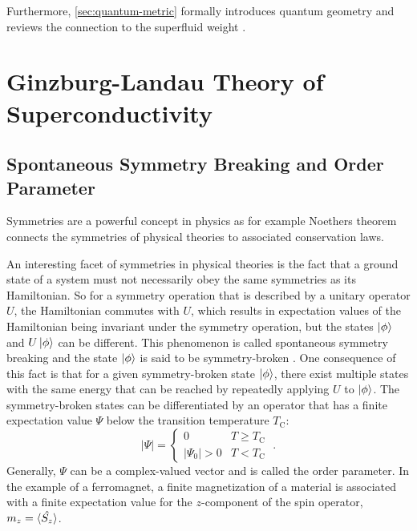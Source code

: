 \documentclass[../main.tex]{subfiles}
\begin{document}
Furthermore, \cref{sec:quantum-metric} formally introduces quantum geometry and reviews the connection to the superfluid weight \cite{peottaSuperfluidityTopologicallyNontrivial2015, yuQuantumGeometryQuantum2024}.

\section{Ginzburg-Landau Theory of Superconductivity}\label{sec:Ginzburg-Landau theory of superconductivity}

\subsection*{Spontaneous Symmetry Breaking and Order Parameter}

Symmetries are a powerful concept in physics as for example Noethers theorem \cite{noetherInvarianteVariationsprobleme1918} connects the symmetries of physical theories to associated conservation laws.

An interesting facet of symmetries in physical theories is the fact that a ground state of a system must not necessarily obey the same symmetries as its Hamiltonian.
So for a symmetry operation that is described by a unitary operator \(U\), the Hamiltonian commutes with \(U\), which results in expectation values of the Hamiltonian being invariant under the symmetry operation, but the states \(\ket{\phi}\) and \(U \ket{\phi}\) can be different.
This phenomenon is called spontaneous symmetry breaking and the state \(\ket{\phi}\) is said to be symmetry-broken \cite{beekmanIntroductionSpontaneousSymmetry2019}.
One consequence of this fact is that for a given symmetry-broken state \(\ket{\phi}\), there exist multiple states with the same energy that can be reached by repeatedly applying \(U\) to \(\ket{\phi}\).
The symmetry-broken states can be differentiated by an operator that has a finite expectation value \(\Psi\) below the transition temperature \(T_{\mathrm{C}}\):
\begin{equation}
	\vert \Psi \vert =
	\begin{cases}
		0 & T \geq T_{\mathrm{C}} \\
		\vert \Psi_0 \vert > 0 & T < T_{\mathrm{C}}
	\end{cases} \;.
\end{equation}
Generally, \(\Psi\) can be a complex-valued vector and is called the order parameter.
In the example of a ferromagnet, a finite magnetization of a material is associated with a finite expectation value for the \(z\)-component of the spin operator, \(m_z = \braket{\hat{S_z}}\).
\end{document}
